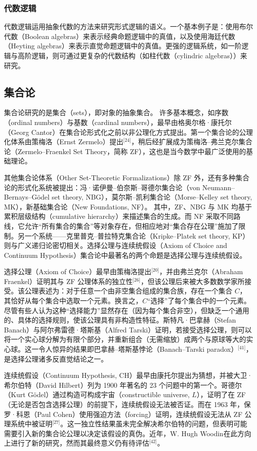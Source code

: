 \subsubsection{代数逻辑}
代数逻辑运用抽象代数的方法来研究形式逻辑的语义。一个基本例子是：使用布尔代数（Boolean algebras）来表示经典命题逻辑中的真值，以及使用海廷代数（Heyting algebras）来表示直觉命题逻辑中的真值。更强的逻辑系统，如一阶逻辑与高阶逻辑，则可通过更复杂的代数结构（如柱代数（cylindric algebras））来研究。
\subsection{集合论}
集合论研究的是集合（sets），即对象的抽象集合。  许多基本概念，如序数（ordinal numbers）与基数（cardinal numbers），最早由格奥尔格·康托尔（Georg Cantor）在集合论形式化之前以非公理化方式提出。第一个集合论的公理化体系由策梅洛（Ernst Zermelo）提出\(^\text{[24]}\)，稍后经扩展成为策梅洛–弗兰克尔集合论（Zermelo–Fraenkel Set Theory，简称 ZF），这也是当今数学中最广泛使用的基础理论。

其他集合论体系（Other Set-Theoretic Formalizations）除 ZF 外，还有多种集合论的形式化系统被提出：冯·诺伊曼–伯奈斯–哥德尔集合论（von Neumann–Bernays–Gödel set theory, NBG），莫尔斯–凯利集合论（Morse–Kelley set theory, MK），新基础集合论（New Foundations, NF）。
其中，ZF、NBG 与 MK 均基于累积层级结构（cumulative hierarchy）来描述集合的生成。而 NF 采取不同路线，它允许“所有集合的集合”等对象存在，但相应地对“集合存在公理”施加了限制。另一个系统——克里普克–普拉特克集合论（Kripke–Platek set theory, KP）则与广义递归论密切相关。选择公理与连续统假设（Axiom of Choice and Continuum Hypothesis）集合论中最著名的两个命题是选择公理与连续统假设。

选择公理（Axiom of Choice）最早由策梅洛提出\(^\text{[20]}\)，并由弗兰克尔（Abraham Fraenkel）证明其与 ZF 公理体系的独立性\(^\text{[26]}\)，但该公理后来被大多数数学家所接受。该公理表述为：对于任意一个由非空集合组成的集合族，存在一个集合 \( C \)，
其恰好从每个集合中选取一个元素。换言之，\( C \)“选择”了每个集合中的一个元素。尽管有些人认为这种“选择能力”显然存在（因为每个集合非空），但缺乏一个通用的、具体的选择规则，使该公理具有非构造性特征。斯特凡·巴拿赫（Stefan Banach）与阿尔弗雷德·塔斯基（Alfred Tarski）证明，若接受选择公理，则可以将一个实心球分解为有限个部分，并重新组合（无需缩放）成两个与原球等大的实心球。这一令人惊异的结果即巴拿赫–塔斯基悖论（Banach–Tarski paradox）\(^\text{[41]}\)，是选择公理诸多反直觉结论之一。

连续统假设（Continuum Hypothesis, CH）最早由康托尔提出为猜想，并被大卫·希尔伯特（David Hilbert）列为 1900 年著名的 23 个问题中的第一个。哥德尔（Kurt Gödel）通过构造可构成宇宙（constructible universe, \(L\)），证明了在 ZF（无论是否包含选择公理）的前提下，连续统假设无法被否证。而在 1963 年，保罗·科恩（Paul Cohen）使用强迫方法（forcing）证明，连续统假设无法从 ZF 公理系统中被证明\(^\text{[27]}\)。这一独立性结果虽未完全解决希尔伯特的问题，但表明可能需要引入新的集合论公理以决定该假设的真伪。近年，W. Hugh Woodin在此方向上进行了新的研究，然而其最终意义仍有待评估\(^\text{[42]}\)。

